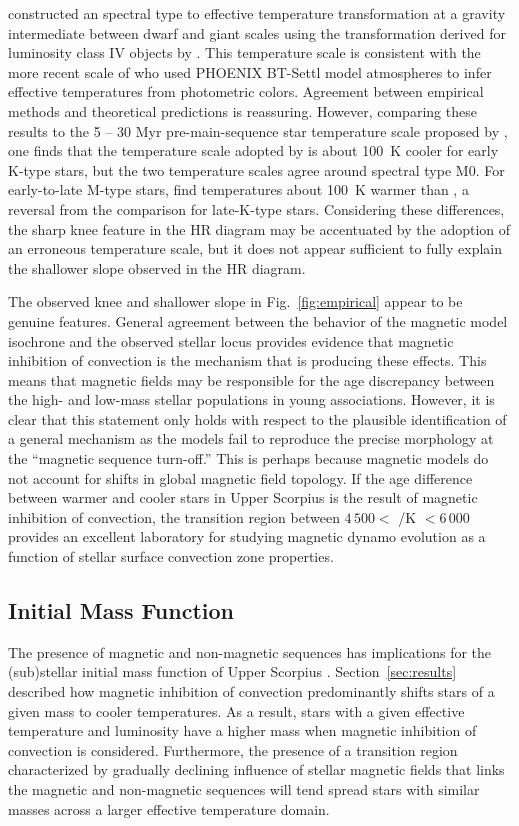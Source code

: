 \documentclass{aa}
\begin{document}
\citet{Preibisch1999} constructed an spectral type to effective temperature transformation at a gravity intermediate between dwarf and giant scales using the transformation derived for luminosity class IV objects by \citet{deJager1987}. This temperature scale is consistent with the more recent scale of \citet{Herczeg2015} who used PHOENIX BT-Settl model atmospheres \citep{Allard2011} to infer effective temperatures from photometric colors. Agreement between empirical methods and theoretical predictions is reassuring. However, comparing these results to the 5 -- 30 Myr pre-main-sequence star temperature scale proposed by \citet{Pecaut2013}, one finds that the temperature scale adopted by \citeauthor{Preibisch1999} is about 100~K cooler for early K-type stars, but the two temperature scales agree around spectral type M0. For early-to-late M-type stars, \citeauthor{Preibisch1999} find temperatures about 100~K warmer than \citet{Pecaut2013}, a reversal from the comparison for late-K-type stars. Considering these differences, the sharp knee feature in the HR diagram may be accentuated by the adoption of an erroneous temperature scale, but it does not appear sufficient to fully explain the shallower slope observed in the HR diagram.

The observed knee and shallower slope in Fig.~\ref{fig:empirical} appear to be genuine features. General agreement between the behavior of the magnetic model isochrone and the observed stellar locus provides evidence that magnetic inhibition of convection is the mechanism that is producing these effects. This means that magnetic fields may be responsible for the age discrepancy between the high- and low-mass stellar populations in young associations. However, it is clear that this statement only holds with respect to the plausible identification of a general mechanism as the models fail to reproduce the precise morphology at the ``magnetic sequence turn-off.'' This is perhaps because magnetic models do not account for shifts in global magnetic field topology. If the age difference between warmer and cooler stars in Upper Scorpius is the result of magnetic inhibition of convection, the transition region between $4\,500 <$ \teff/K $< 6\,000$ provides an excellent laboratory for studying magnetic dynamo evolution as a function of stellar surface convection zone properties.

\subsection{Initial Mass Function}
The presence of magnetic and non-magnetic sequences has implications for the (sub)stellar initial mass function of Upper Scorpius \citep{Ardila2000, Preibisch2002}. Section~\ref{sec:results} described how magnetic inhibition of convection predominantly shifts stars of a given mass to cooler temperatures. As a result, stars with a given effective temperature and luminosity have a higher mass when magnetic inhibition of convection is considered. Furthermore, the presence of a transition region characterized by gradually declining influence of stellar magnetic fields that links the magnetic and non-magnetic sequences will tend spread stars with similar masses across a larger effective temperature domain. 
\end{document}

